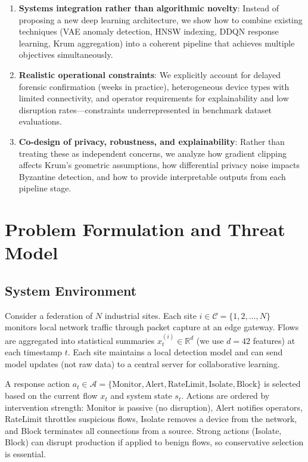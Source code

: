 \documentclass[preprint,12pt]{elsarticle}
\begin{document}
\begin{enumerate}[leftmargin=1.3em]
    \item \textbf{Systems integration rather than algorithmic novelty}: Instead of proposing a new deep learning architecture, we show how to combine existing techniques (VAE anomaly detection, HNSW indexing, DDQN response learning, Krum aggregation) into a coherent pipeline that achieves multiple objectives simultaneously.
    
    \item \textbf{Realistic operational constraints}: We explicitly account for delayed forensic confirmation (weeks in practice), heterogeneous device types with limited connectivity, and operator requirements for explainability and low disruption rates---constraints underrepresented in benchmark dataset evaluations.
    
    \item \textbf{Co-design of privacy, robustness, and explainability}: Rather than treating these as independent concerns, we analyze how gradient clipping affects Krum's geometric assumptions, how differential privacy noise impacts Byzantine detection, and how to provide interpretable outputs from each pipeline stage.
\end{enumerate}

\section{Problem Formulation and Threat Model}
\label{sec:problem}

\subsection{System Environment}

Consider a federation of $N$ industrial sites. Each site $i \in \mathcal{C} = \{1, 2, \ldots, N\}$ monitors local network traffic through packet capture at an edge gateway. Flows are aggregated into statistical summaries $x_t^{(i)} \in \mathbb{R}^d$ (we use $d=42$ features) at each timestamp $t$. Each site maintains a local detection model and can send model updates (not raw data) to a central server for collaborative learning.

A response action $a_t \in \mathcal{A} = \{\text{Monitor}, \text{Alert}, \text{RateLimit}, \text{Isolate}, \text{Block}\}$ is selected based on the current flow $x_t$ and system state $s_t$. Actions are ordered by intervention strength: Monitor is passive (no disruption), Alert notifies operators, RateLimit throttles suspicious flows, Isolate removes a device from the network, and Block terminates all connections from a source. Strong actions (Isolate, Block) can disrupt production if applied to benign flows, so conservative selection is essential.
\end{document}
